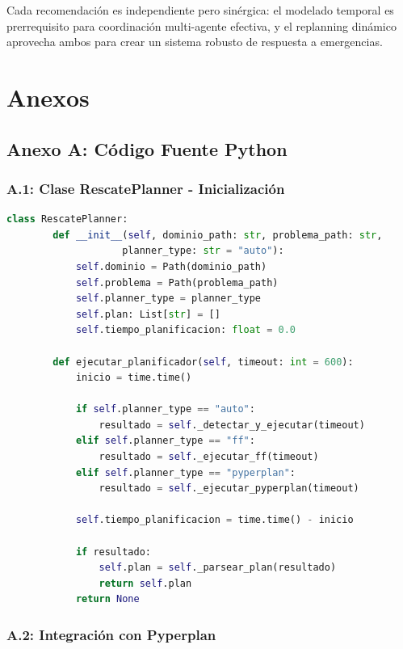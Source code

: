 \documentclass[conference]{IEEEtran}
\begin{document}
    Cada recomendación es independiente pero sinérgica: el modelado temporal es prerrequisito para coordinación multi-agente efectiva, y el replanning dinámico aprovecha ambos para crear un sistema robusto de respuesta a emergencias.

    \section*{Anexos}

    \subsection*{Anexo A: Código Fuente Python}

    \subsubsection*{A.1: Clase RescatePlanner - Inicialización}

    \begin{lstlisting}[style=anexostyle,language=Python,caption={Inicialización del planificador y ejecución}]
    class RescatePlanner:
        def __init__(self, dominio_path: str, problema_path: str, 
                    planner_type: str = "auto"):
            self.dominio = Path(dominio_path)
            self.problema = Path(problema_path)
            self.planner_type = planner_type
            self.plan: List[str] = []
            self.tiempo_planificacion: float = 0.0
            
        def ejecutar_planificador(self, timeout: int = 600):
            inicio = time.time()
            
            if self.planner_type == "auto":
                resultado = self._detectar_y_ejecutar(timeout)
            elif self.planner_type == "ff":
                resultado = self._ejecutar_ff(timeout)
            elif self.planner_type == "pyperplan":
                resultado = self._ejecutar_pyperplan(timeout)
            
            self.tiempo_planificacion = time.time() - inicio
            
            if resultado:
                self.plan = self._parsear_plan(resultado)
                return self.plan
            return None
    \end{lstlisting}

    \subsubsection*{A.2: Integración con Pyperplan}
\end{document}
